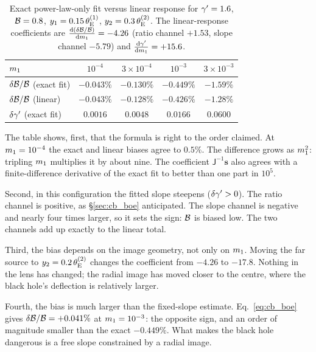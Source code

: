 \begin{table}[ht]
\centering
\caption{Exact power-law-only fit versus linear response for $\gamma'=1.6$,
$\mathcal{B}=0.8$, $y_1=0.15\,\theta_{\mathrm{E}}^{(1)}$, $y_2=0.3\,\theta_{\mathrm{E}}^{(2)}$.
The linear-response coefficients are
$\frac{\mathrm{d} (\delta\mathcal{B}/\mathcal{B})}{\mathrm{d} m_1} = -4.26$ (ratio channel $+1.53$,
slope channel $-5.79$) and $\frac{\mathrm{d} \gamma'}{\mathrm{d} m_1}=+15.6$.
}
\label{tab:cb_worked}
\begin{tabular}{lcccc}
\toprule
$m_1$ & $10^{-4}$ & $3\times10^{-4}$ & $10^{-3}$ & $3\times10^{-3}$\\
\midrule
$\delta\mathcal{B}/\mathcal{B}$ (exact fit) & $-0.043\%$ & $-0.130\%$ & $-0.449\%$ & $-1.59\%$\\
$\delta\mathcal{B}/\mathcal{B}$ (linear)    & $-0.043\%$ & $-0.128\%$ & $-0.426\%$ & $-1.28\%$\\
$\delta\gamma'$ (exact fit)         & $0.0016$   & $0.0048$   & $0.0166$   & $0.0600$\\
\bottomrule
\end{tabular}
\end{table}

\noindent The table shows, first, that the formula is right to the
order claimed. At $m_1=10^{-4}$ the exact and linear biases agree to
$0.5\%$. The difference grows as $m_1^2$: tripling $m_1$
multiplies it by about nine. The coefficient $\mathsf{J}^{-1}\mathbf{s}$
also agrees with a finite-difference derivative of the exact fit to
better than one part in $10^{5}$.

Second, in this configuration the fitted slope steepens
($\delta\gamma'>0$). The ratio channel is positive, as \S\ref{sec:cb_boe}
anticipated. The slope channel is negative and nearly four times
larger, so it sets the sign: $\mathcal{B}$ is biased low. The two channels
add up exactly to the linear total.

Third, the bias depends on the image geometry, not only on $m_1$.
Moving the far source to $y_2=0.2\,\theta_{\mathrm{E}}^{(2)}$ changes the
coefficient from $-4.26$ to $-17.8$. Nothing in the lens has changed;
the radial image has moved closer to the centre, where the black hole's
deflection is relatively larger.

Fourth, the bias is much larger than the fixed-slope estimate.
Eq.~\eqref{eq:cb_boe} gives $\delta\mathcal{B}/\mathcal{B}=+0.041\%$ at
$m_1=10^{-3}$: the opposite sign, and an order of magnitude smaller
than the exact $-0.449\%$. What makes the black hole dangerous is a
free slope constrained by a radial image.

